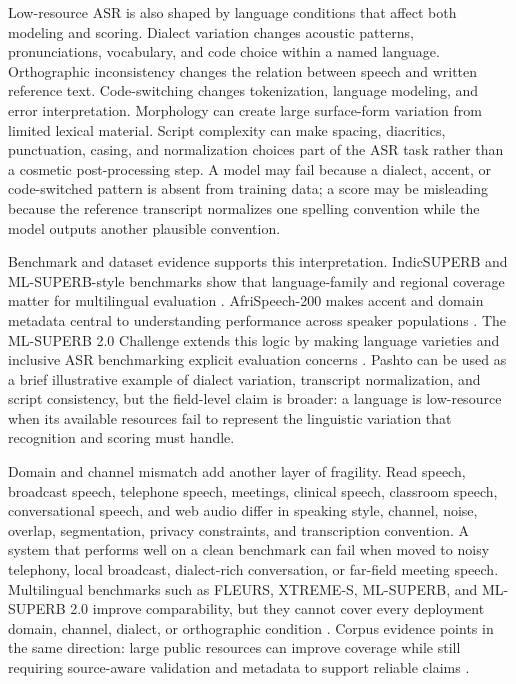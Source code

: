 \documentclass[pdflatex,sn-basic]{sn-jnl}
\theoremstyle{thmstyleone}
\theoremstyle{thmstyletwo}
\theoremstyle{thmstylethree}
\begin{document}
Low-resource ASR is also shaped by language conditions that affect both modeling and scoring. Dialect variation changes acoustic patterns, pronunciations, vocabulary, and code choice within a named language. Orthographic inconsistency changes the relation between speech and written reference text. Code-switching changes tokenization, language modeling, and error interpretation. Morphology can create large surface-form variation from limited lexical material. Script complexity can make spacing, diacritics, punctuation, casing, and normalization choices part of the ASR task rather than a cosmetic post-processing step. A model may fail because a dialect, accent, or code-switched pattern is absent from training data; a score may be misleading because the reference transcript normalizes one spelling convention while the model outputs another plausible convention.

Benchmark and dataset evidence supports this interpretation. IndicSUPERB and ML-SUPERB-style benchmarks show that language-family and regional coverage matter for multilingual evaluation \citep{javed2023indsuperb,shi2023mlsuperb}. AfriSpeech-200 makes accent and domain metadata central to understanding performance across speaker populations \citep{olatunji2023_afrispeech200}. The ML-SUPERB 2.0 Challenge extends this logic by making language varieties and inclusive ASR benchmarking explicit evaluation concerns \citep{chen2025mlsuperb2challenge}. Pashto can be used as a brief illustrative example of dialect variation, transcript normalization, and script consistency, but the field-level claim is broader: a language is low-resource when its available resources fail to represent the linguistic variation that recognition and scoring must handle.

Domain and channel mismatch add another layer of fragility. Read speech, broadcast speech, telephone speech, meetings, clinical speech, classroom speech, conversational speech, and web audio differ in speaking style, channel, noise, overlap, segmentation, privacy constraints, and transcription convention. A system that performs well on a clean benchmark can fail when moved to noisy telephony, local broadcast, dialect-rich conversation, or far-field meeting speech. Multilingual benchmarks such as FLEURS, XTREME-S, ML-SUPERB, and ML-SUPERB 2.0 improve comparability, but they cannot cover every deployment domain, channel, dialect, or orthographic condition \citep{conneau2022fleurs,conneau2022xtreme_s,shi2024mlsuperb2}. Corpus evidence points in the same direction: large public resources can improve coverage while still requiring source-aware validation and metadata to support reliable claims \citep{ardila2020commonvoice,wang2021voxpopuli,lau2025_data_quality_multilingual_speech}.
\end{document}

